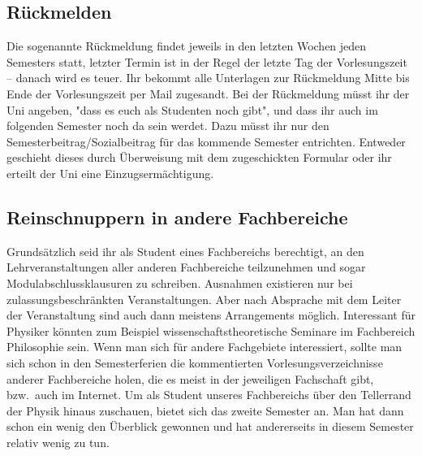 \begin{multicols}{2}
\subsection{Rückmelden}
Die sogenannte Rückmeldung findet jeweils in den letzten Wochen jeden Semesters statt, letzter Termin ist in der Regel der letzte Tag der Vorlesungszeit -- danach wird es teuer.
Ihr bekommt alle Unterlagen zur Rückmeldung Mitte bis Ende der Vorlesungszeit per Mail zugesandt.
Bei der Rückmeldung müsst ihr der Uni angeben, "dass es euch als Studenten noch gibt", und dass ihr auch im folgenden Semester noch da sein werdet.
Dazu müsst ihr nur den Semesterbeitrag/Sozialbeitrag für das kommende Semester entrichten.
Entweder geschieht dieses durch Überweisung mit dem zugeschickten Formular oder ihr erteilt der Uni eine Einzugsermächtigung.

\subsection{Reinschnuppern in andere Fachbereiche}
Grundsätzlich seid ihr als Student
eines Fachbereichs berechtigt, an den Lehrveranstaltungen aller anderen Fachbereiche teilzunehmen und sogar Modulabschlussklausuren zu schreiben.
Ausnahmen existieren nur bei zulassungsbeschränkten Veranstaltungen.
Aber nach Absprache mit dem Leiter der Veranstaltung sind auch dann meistens Arrangements möglich.
Interessant für Physiker könnten zum Beispiel wissenschaftstheoretische Seminare im Fachbereich Philosophie sein.
Wenn man sich für andere Fachgebiete interessiert, sollte man sich schon in den Semesterferien die kommentierten Vorlesungsverzeichnisse anderer Fachbereiche holen, die es meist in der jeweiligen Fachschaft gibt, bzw.\ auch im Internet.
Um als Student unseres Fachbereichs über den Tellerrand der Physik hinaus zuschauen, bietet sich das zweite Semester an.
Man hat dann schon ein wenig den Überblick gewonnen und hat andererseits in diesem Semester relativ wenig zu tun.

\end{multicols}
